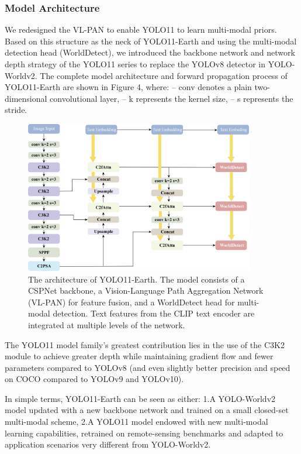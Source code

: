 \documentclass{article}
\begin{document}
\subsubsection{Model Architecture}
We redesigned the VL-PAN to enable YOLO11 to learn multi-modal priors.
Based on this structure as the neck of YOLO11-Earth and using the multi-modal
detection head (WorldDetect), we introduced the backbone network and network
depth strategy of the YOLO11 series to replace the YOLOv8 detector in
YOLO-Worldv2.
The complete model architecture and forward propagation process of
YOLO11-Earth are shown in Figure 4, where:
    – conv denotes a plain two-dimensional convolutional layer,
    – k represents the kernel size,
    – s represents the stride.
\begin{figure}[htbp]
    \centering
    \includegraphics[width=10cm]{../image/4.png}
    \caption{The architecture of YOLO11-Earth. The model consists of a CSPNet backbone, a Vision-Language Path Aggregation Network (VL-PAN) for feature fusion, and a WorldDetect head for multi-modal detection. Text features from the CLIP text encoder are integrated at multiple levels of the network.}
    \label{fig:yolo11-earth-architecture}
\end{figure}
The YOLO11 model family’s greatest contribution lies in the use of the C3K2 module to achieve greater depth  
while maintaining gradient flow and fewer parameters compared to YOLOv8 (and even slightly better precision  
and speed on COCO compared to YOLOv9 and YOLOv10).

In simple terms, YOLO11-Earth can be seen as either:  
    1.A YOLO-Worldv2 model updated with a new backbone network and trained on a small closed-set multi-modal scheme,  
    2.A YOLO11 model endowed with new multi-modal learning capabilities, retrained on remote-sensing benchmarks  
         and adapted to application scenarios very different from YOLO-Worldv2.
\end{document}
